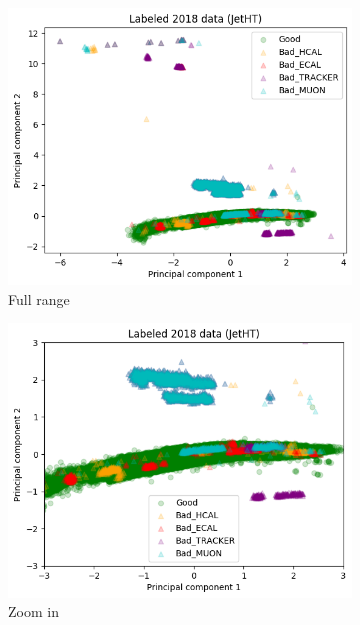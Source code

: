 \begin{figure}[h!]
\begin{subfigure}[b]{0.49\linewidth}
        \includegraphics[width=\linewidth]{images/reco/2018/JetHT_subsystem_label.png}
        \caption{Full range}
    \end{subfigure}
    \begin{subfigure}[b]{0.49\linewidth}
        \includegraphics[width=\linewidth]{images/reco/2018/JetHT_subsystem_label_short_range.png}
        \caption{Zoom in}
    \end{subfigure}
    \begin{subfigure}[b]{0.49\linewidth}

\end{subfigure}
\end{figure}
